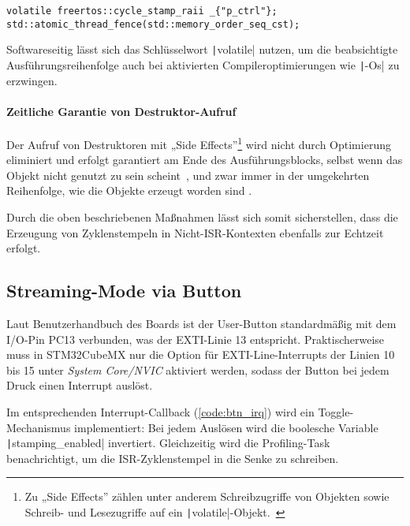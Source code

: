 \begin{code}
\begin{verbatim}
volatile freertos::cycle_stamp_raii _{"p_ctrl"};
std::atomic_thread_fence(std::memory_order_seq_cst);
\end{verbatim}
    \label{code:memory_barrier}
\end{code}

Softwareseitig lässt sich das Schlüsselwort \texttt|volatile| nutzen,
um die beabsichtigte Ausführungsreihenfolge auch bei aktivierten
Compileroptimierungen wie \texttt|-Os| zu erzwingen.

\paragraph{Zeitliche Garantie von Destruktor-Aufruf}

Der Aufruf von Destruktoren mit „Side Effects”\footnote{Zu „Side Effects” zählen
unter anderem Schreibzugriffe von Objekten sowie Schreib- und Lesezugriffe auf
ein \texttt|volatile|-Objekt.~\cite{cppreference_eval_order}} wird
nicht durch Optimierung eliminiert und erfolgt garantiert am Ende des
Ausführungsblocks, selbst wenn das Objekt nicht genutzt zu sein
scheint~\cite[§6.7.5.4 Abs. 3]{iso_iec_14882_2020}, und zwar immer in der
umgekehrten Reihenfolge, wie die Objekte erzeugt worden sind
\cite{isocpp_dtor_order}.

Durch die oben beschriebenen Maßnahmen lässt sich somit sicherstellen, dass die
Erzeugung von Zyklenstempeln in Nicht-ISR-Kontexten ebenfalls zur Echtzeit
erfolgt.

\subsection{Streaming-Mode via Button}

Laut Benutzerhandbuch des Boards ist der User-Button standardmäßig mit dem
I/O-Pin PC13 verbunden, was der \ac{EXTI}-Linie 13 entspricht. Praktischerweise
muss in STM32CubeMX nur die Option für EXTI-Line-Interrupts der Linien 10 bis 15
unter \textit{System Core/NVIC} aktiviert werden, sodass der Button bei jedem
Druck einen Interrupt auslöst.

Im entsprechenden Interrupt-Callback (\ref{code:btn_irq}) wird ein
Toggle-Mechanismus implementiert: Bei jedem Auslösen wird die boolesche Variable
\texttt|stamping_enabled| invertiert. Gleichzeitig wird die
Profiling-Task benachrichtigt, um die ISR-Zyklenstempel in die Senke zu
schreiben.


